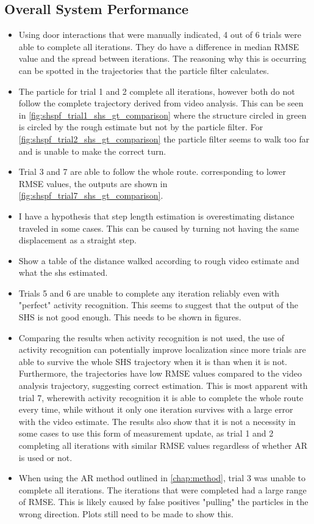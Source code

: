 \newpage
\subsection*{Overall System Performance}

\begin{itemize}
	\item Using door interactions that were manually indicated, 4 out of 6 trials were able to complete all iterations. They do have a difference in median RMSE value and the spread between iterations. The reasoning why this is occurring can be spotted in the trajectories that the particle filter calculates.  
	\item The particle for trial 1 and 2 complete all iterations, however both do not follow the complete trajectory derived from video analysis. This can be seen in  \cref{fig:shspf_trial1_shs_gt_comparison} where the structure circled in green is circled by the rough estimate but not by the particle filter. For \cref{fig:shspf_trial2_shs_gt_comparison} the particle filter seems to walk too far and is unable to make the correct turn.
	\item Trial 3 and 7 are able to follow the whole route. corresponding to lower RMSE values, the outputs are shown in \cref{fig:shspf_trial7_shs_gt_comparison}.
	\item I have a hypothesis that step length estimation is overestimating distance traveled in some cases. This can be caused by turning not having the same displacement as a straight step.
	\item Show a table of the distance walked according to rough video estimate and what the shs estimated.
	
	\item Trials 5 and 6 are unable to complete any iteration reliably even with "perfect" activity recognition. This seems to suggest that the output of the SHS is not good enough. This needs to be shown in figures.
	
	\item Comparing the results when activity recognition is not used, the use of activity recognition can potentially improve localization since more trials are able to survive the whole SHS trajectory when it is than when it is not. Furthermore, the trajectories have low RMSE values compared to the video analysis trajectory, suggesting correct estimation. This is most apparent with trial 7, wherewith activity recognition it is able to complete the whole route every time, while without it only one iteration survives with a large error with the video estimate. The results also show that it is not a necessity in some cases to use this form of measurement update, as trial 1 and 2 completing all iterations with similar RMSE values regardless of whether AR is used or not.
	\item When using the AR method outlined in \cref{chap:method}, trial 3 was unable to complete all iterations. The iterations that were completed had a large range of RMSE. This is likely caused by false positives "pulling" the particles in the wrong direction. Plots still need to be made to show this.
\end{itemize}


